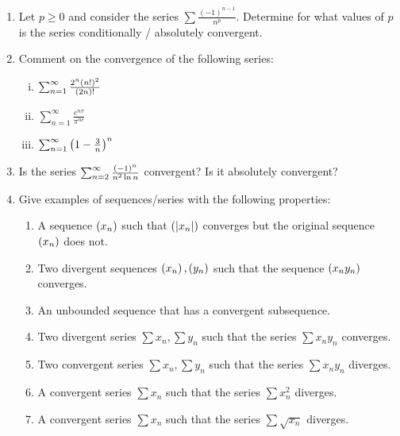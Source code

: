 \documentclass[journal,12pt,onecolumn]{IEEEtran}
\begin{document}
\begin{enumerate}
\item Let $p \ge 0$ and consider the series 
$\sum\frac{(-1)^{n-1}}{n^p}$.
Determine for what values of $p$ is the series conditionally / absolutely convergent.

\item Comment on the convergence of the following series:
\begin{multicols}{3}
\begin{enumerate}[(i)]
\item $\sum_{n=1}^{\infty}\frac{2^n\left(n!\right)^2}{\left(2n\right)!}$
\item $\sum_{n=1}^{\infty}\frac{e^{n\pi}}{\pi^{ne}}$
\item $\sum_{n=1}^{\infty}\left(1 - \frac{3}{n}\right)^n$
\end{enumerate}
\end{multicols}
\item Is the series $\sum^{\infty}_{n=2}\frac{\left(-1\right)^n}{n^2\ln n}$ convergent?  Is it absolutely convergent?
\item Give examples of sequences/series with the following properties:
\begin{enumerate}
\item A sequence $\left(x_n\right)$ such that $\left(\left\vert x_n\right\vert\right)$ converges but the original sequence $\left(x_n\right)$ does not.
\item Two divergent sequences $\left(x_n\right), \left(y_n\right)$ such that the sequence $\left(x_ny_n\right)$ converges.
\item An unbounded sequence that has a convergent subsequence.
\item Two divergent series $\sum x_n, \sum y_n$ such that the series $\sum x_ny_n$ converges.
\item Two convergent series $\sum x_n, \sum y_n$ such that the series $\sum x_ny_n$ diverges.
\item A convergent series $\sum x_n$ such that the series $\sum x_n^2$ diverges.
\item A convergent series $\sum x_n$ such that the series $\sum \sqrt{x_n}$ diverges.
\end{enumerate}
\end{enumerate}
\end{document}
